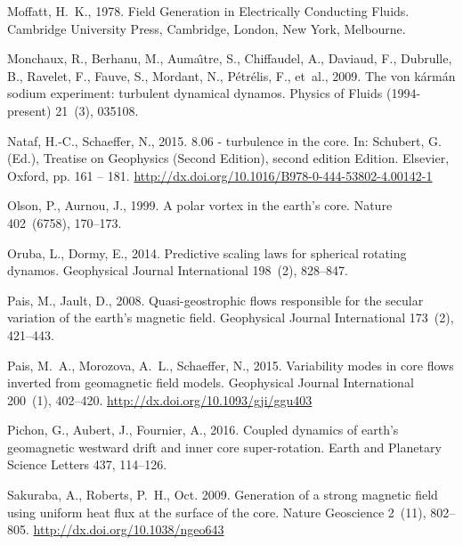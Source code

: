 \documentclass[12pt, a4paper]{article}
\begin{document}
\begin{thebibliography}{73}
Moffatt, H.~K., 1978. Field Generation in Electrically Conducting Fluids.
  Cambridge University Press, Cambridge, London, New York, Melbourne.

Monchaux, R., Berhanu, M., Auma{\^\i}tre, S., Chiffaudel, A., Daviaud, F.,
  Dubrulle, B., Ravelet, F., Fauve, S., Mordant, N., P{\'e}tr{\'e}lis, F.,
  et~al., 2009. The von k{\'a}rm{\'a}n sodium experiment: turbulent dynamical
  dynamos. Physics of Fluids (1994-present) 21~(3), 035108.

Nataf, H.-C., Schaeffer, N., 2015. 8.06 - turbulence in the core. In: Schubert,
  G. (Ed.), Treatise on Geophysics (Second Edition), second edition Edition.
  Elsevier, Oxford, pp. 161 -- 181.
\newline\urlprefix\url{http://dx.doi.org/10.1016/B978-0-444-53802-4.00142-1}

Olson, P., Aurnou, J., 1999. A polar vortex in the earth's core. Nature
  402~(6758), 170--173.

Oruba, L., Dormy, E., 2014. Predictive scaling laws for spherical rotating
  dynamos. Geophysical Journal International 198~(2), 828--847.

Pais, M., Jault, D., 2008. Quasi-geostrophic flows responsible for the secular
  variation of the earth's magnetic field. Geophysical Journal International
  173~(2), 421--443.

Pais, M.~A., Morozova, A.~L., Schaeffer, N., 2015. Variability modes in core
  flows inverted from geomagnetic field models. Geophysical Journal
  International 200~(1), 402--420.
\newline\urlprefix\url{http://dx.doi.org/10.1093/gji/ggu403}

Pichon, G., Aubert, J., Fournier, A., 2016. Coupled dynamics of earth's
  geomagnetic westward drift and inner core super-rotation. Earth and Planetary
  Science Letters 437, 114--126.

Sakuraba, A., Roberts, P.~H., Oct. 2009. Generation of a strong magnetic field
  using uniform heat flux at the surface of the core. Nature Geoscience 2~(11),
  802--805.
\newline\urlprefix\url{http://dx.doi.org/10.1038/ngeo643}


\end{thebibliography}
\end{document}
